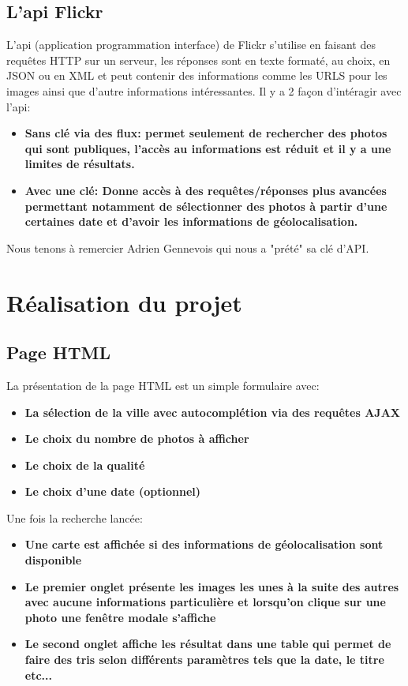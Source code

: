 \documentclass[a4paper, 11pt]{article}
\begin{document}
\subsection*{L'api Flickr}
L'api (application programmation interface) de Flickr s'utilise en faisant des requêtes HTTP sur un serveur, les réponses sont en texte formaté, au choix, en JSON ou en XML et peut contenir des informations comme les URLS pour les images ainsi que d'autre informations intéressantes.
\newline
\newline
Il y a 2 façon d'intéragir avec l'api:
    \begin{itemize}
            \item \textbf{Sans clé via des flux: permet seulement de rechercher des photos qui sont publiques, l'accès au informations est réduit et il y a une limites de résultats.}
            \item \textbf{Avec une clé: Donne accès à des requêtes/réponses plus avancées permettant notamment de sélectionner des photos à partir d'une certaines date et d'avoir les informations de géolocalisation.}
    \end{itemize}
\newline 
Nous tenons à remercier Adrien Gennevois qui nous a "prété" sa clé d'API.

\section*{Réalisation du projet}

    \subsection*{Page HTML }
        La présentation de la page HTML est un simple formulaire avec:
        \newline
        \begin{itemize}
            \item \textbf{La sélection de la ville avec autocomplétion via des requêtes AJAX}
            \item \textbf{Le choix du nombre de photos à afficher}
            \item \textbf{Le choix de la qualité}
            \item \textbf{Le choix d'une date (optionnel)}
        \end{itemize}
        \newline
        Une fois la recherche lancée:
        \newline
    \begin{itemize}
            \item \textbf{Une carte est affichée si des informations de géolocalisation sont disponible}
            \item \textbf{Le premier onglet présente les images les unes à la suite des autres avec aucune informations particulière et lorsqu'on clique sur une photo une fenêtre modale s'affiche}
            \item \textbf{Le second onglet affiche les résultat dans une table qui permet de faire des tris selon différents paramètres tels que la date, le titre etc...}
    \end{itemize}
\end{document}
